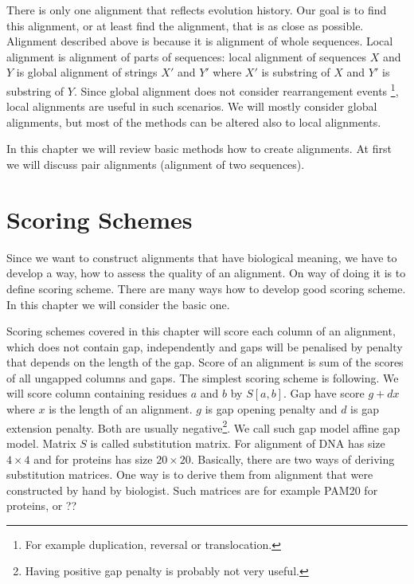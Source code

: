 There is only one alignment that reflects evolution history. Our goal is to find
this alignment, or at least find the alignment, that is as close as possible.
Alignment described above is  because it is
alignment of whole sequences. Local alignment is alignment of parts of
sequences: local alignment of sequences $X$ and $Y$ is global alignment of
strings $X'$ and $Y'$ where $X'$ is substring of $X$ and $Y'$ is substring of
$Y$.  Since global alignment does not consider rearrangement events
\footnote{For example duplication, reversal or translocation.}, local alignments
are useful in such scenarios.  We will mostly consider global alignments, but
most of the methods can be altered also to local alignments.

In this chapter we will review basic methods how to create alignments. At first
we will discuss pair alignments (alignment of two sequences). 

\section{Scoring Schemes}

Since we want to construct alignments that have biological meaning, we have to
develop a way, how to assess the quality of an alignment. On way of doing it is
to define scoring scheme. There are many ways how to develop good scoring
scheme. In this chapter we will consider the basic one.


Scoring schemes covered in this chapter will score each column of an alignment,
which does not contain gap, independently and gaps will be penalised by penalty
that depends on the length of the gap. Score of an alignment is sum of the
scores of all ungapped columns and gaps. The simplest scoring scheme is
following. We will score column containing residues $a$ and $b$ by $S[a,b]$.
Gap have score $g+dx$ where $x$ is the length of an alignment. $g$ is gap
opening penalty and $d$ is gap extension penalty. Both are usually
negative\footnote{Having positive gap penalty is probably not very useful.}.  We
call such gap model affine gap model.  Matrix $S$ is called substitution matrix.
For alignment of DNA has size $4\times 4$ and for proteins has size $20\times
20$. Basically, there are two ways of deriving substitution matrices. One way is
to derive them from alignment that were constructed by hand by biologist. Such
matrices are for example PAM20 for proteins, or ?? 


